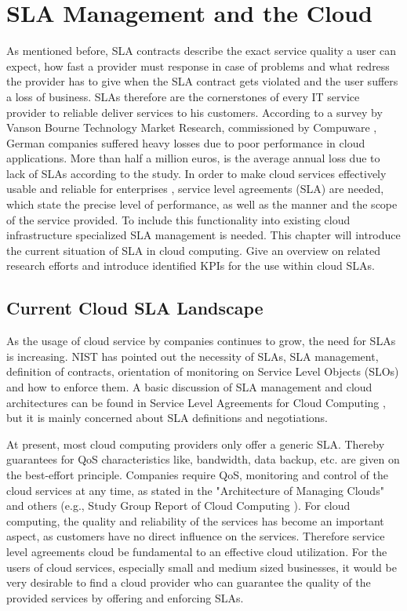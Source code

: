 
\chapter{SLA Management and the Cloud} %

As mentioned before, SLA contracts describe the exact service quality a user can expect, how fast a provider must response in case of problems and what redress the provider has to give when the SLA contract gets violated and the user suffers a loss of business. SLAs therefore are the cornerstones of every IT service provider to reliable deliver services to his customers. According to a survey by Vanson Bourne Technology Market Research, commissioned by Compuware  \cite{Bourne}, German companies suffered heavy losses due to poor performance in cloud applications. More than half a million euros, is the average annual loss due to lack of SLAs according to the study. In order to make cloud services effectively usable  \cite{IDC} and reliable for enterprises  \cite{JTC}, service level agreements (SLA) are needed, which state the precise level of performance, as well as the manner and the scope of the service provided. To include this functionality into existing cloud infrastructure specialized SLA management is needed. This chapter will introduce the current situation of SLA in cloud computing. Give an overview on related research efforts and introduce identified KPIs for the use within cloud SLAs.


\section{Current Cloud SLA Landscape}
As the usage of cloud service by companies continues to grow, the need for SLAs is increasing. NIST  \cite{NISTArch} has pointed out the necessity of SLAs, SLA management, definition of contracts, orientation of monitoring on Service Level Objects (SLOs) and how to enforce them. A basic discussion of SLA management and cloud architectures can be found in Service Level Agreements for Cloud Computing  \cite{Wieder2011}, but it is mainly concerned about SLA definitions and negotiations.

At present, most cloud computing providers only offer a generic SLA. Thereby guarantees for QoS characteristics like, bandwidth, data backup, etc. are given  on the best-effort principle. Companies require QoS, monitoring and control of the cloud services at any time, as stated in the "Architecture of Managing Clouds"  \cite{DMTF2010} and others (e.g., Study Group Report of Cloud Computing  \cite{SC38StudyGroup2011}). For cloud computing, the quality and reliability of the services has become an important aspect, as customers have no direct influence on the services. Therefore service level agreements cloud be fundamental to an effective cloud utilization. For the users of cloud services, especially small and medium sized businesses, it would be very desirable to find a cloud provider who can guarantee the quality of the provided services by offering and enforcing SLAs.

